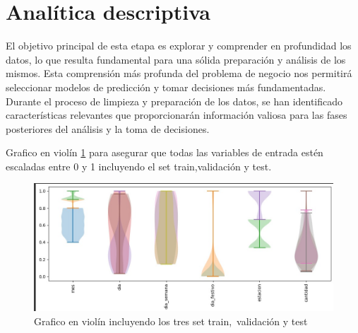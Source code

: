 \section{Analítica descriptiva}
El objetivo principal de esta etapa es explorar y comprender en profundidad los datos, lo que resulta fundamental para una sólida preparación y análisis de los mismos. Esta comprensión más profunda del problema de negocio nos permitirá seleccionar modelos de predicción y tomar decisiones más fundamentadas. Durante el proceso de limpieza y preparación de los datos, se han identificado características relevantes que proporcionarán información valiosa para las fases posteriores del análisis y la toma de decisiones.

\vspace{1\baselineskip}
Grafico en violín \ref{fig:grafico_violin} para asegurar que todas las variables de entrada estén escaladas entre 0 y 1 incluyendo el set train,validación y test.
\begin{figure}[H]
  \begin{center}
    \includegraphics[scale=0.50]{./grafico_violin.jpg}
    \caption{Grafico en violín incluyendo los tres set train, validación y test}
    \label{fig:grafico_violin}
  \end{center}
\end{figure}

